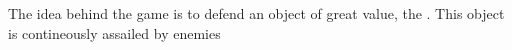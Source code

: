 The idea behind the game is to defend an object of great value, the \objective.
This object is contineously assailed by enemies 
